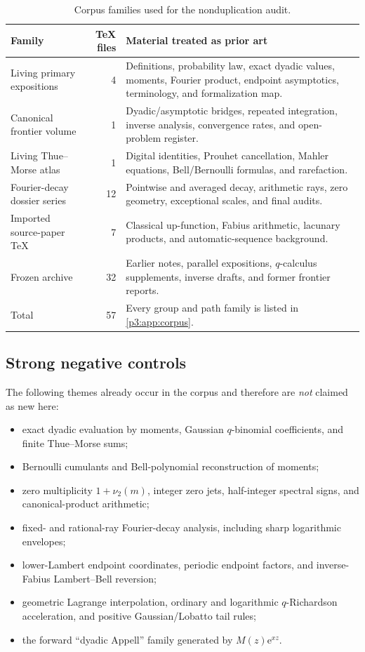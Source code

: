 \documentclass[11pt,oneside]{article}
\numberwithin{equation}{section}
\theoremstyle{definition}
\theoremstyle{remark}
\newcommand{\e}{\mathrm e}
\begin{document}
\begin{table}[H]
\centering
\caption{Corpus families used for the nonduplication audit.}
\label{p3:tab:corpus-summary}
\begin{tabularx}{\textwidth}{@{}l r X@{}}
\toprule
Family & TeX files & Material treated as prior art \\
\midrule
Living primary expositions & 4 & Definitions, probability law, exact dyadic values, moments, Fourier product, endpoint asymptotics, terminology, and formalization map.\\
Canonical frontier volume & 1 & Dyadic/asymptotic bridges, repeated integration, inverse analysis, convergence rates, and open-problem register.\\
Living Thue--Morse atlas & 1 & Digital identities, Prouhet cancellation, Mahler equations, Bell/Bernoulli formulas, and rarefaction.\\
Fourier-decay dossier series & 12 & Pointwise and averaged decay, arithmetic rays, zero geometry, exceptional scales, and final audits.\\
Imported source-paper TeX & 7 & Classical up-function, Fabius arithmetic, lacunary products, and automatic-sequence background.\\
Frozen archive & 32 & Earlier notes, parallel expositions, $q$-calculus supplements, inverse drafts, and former frontier reports.\\
\midrule
Total & 57 & Every group and path family is listed in \cref{p3:app:corpus}.\\
\bottomrule
\end{tabularx}
\end{table}

\subsection{Strong negative controls}

The following themes already occur in the corpus and therefore are \emph{not} claimed as new here:
\begin{itemize}
\item exact dyadic evaluation by moments, Gaussian $q$-binomial coefficients, and finite Thue--Morse sums;
\item Bernoulli cumulants and Bell-polynomial reconstruction of moments;
\item zero multiplicity $1+\nu_2(m)$, integer zero jets, half-integer spectral signs, and canonical-product arithmetic;
\item fixed- and rational-ray Fourier-decay analysis, including sharp logarithmic envelopes;
\item lower-Lambert endpoint coordinates, periodic endpoint factors, and inverse-Fabius Lambert--Bell reversion;
\item geometric Lagrange interpolation, ordinary and logarithmic $q$-Richardson acceleration, and positive Gaussian/Lobatto tail rules;
\item the forward ``dyadic Appell'' family generated by $M(z)\e^{xz}$.
\end{itemize}
\end{document}
